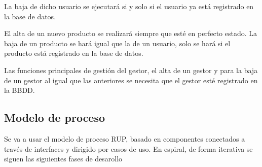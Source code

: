 \noindent La baja de dicho usuario se ejecutará si y solo si el usuario ya está registrado en la base de datos.

El alta de un nuevo producto se realizará siempre que esté en perfecto estado. La baja de un producto se hará igual que la de un usuario, solo se hará si el producto está registrado en la base de datos.

Las funciones principales de gestión del gestor, el alta de un gestor y para la baja de un gestor al igual que las anteriores se necesita que el gestor esté registrado en la BBDD.

\subsection{Modelo de proceso}
Se va a usar el modelo de proceso RUP, basado en componentes conectados a través de interfaces y dirigido por casos de uso. En espiral, de forma iterativa se siguen las siguientes fases de desarollo
